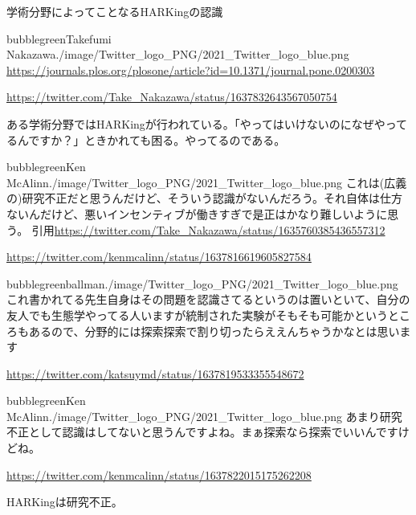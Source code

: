 \begin{SMbox}{学術分野によってことなるHARKingの認識}
        \begin{rightbubbles}{bubblegreen}{Takefumi Nakazawa}{./image/Twitter_logo_PNG/2021_Twitter_logo_blue.png}
            \url{https://journals.plos.org/plosone/article?id=10.1371/journal.pone.0200303}
            \begin{flushright} 
            \small	\url{https://twitter.com/Take_Nakazawa/status/1637832643567050754}
            \end{flushright}    
        \end{rightbubbles}
        
ある学術分野ではHARKingが行われている。「やってはいけないのになぜやってるんですか？」ときかれても困る。やってるのである。


\begin{rightbubbles}{bubblegreen}{Ken McAlinn}{./image/Twitter_logo_PNG/2021_Twitter_logo_blue.png}
    これは(広義の)研究不正だと思うんだけど、そういう認識がないんだろう。それ自体は仕方ないんだけど、悪いインセンティブが働きすぎで是正はかなり難しいように思う。
    引用\url{https://twitter.com/Take_Nakazawa/status/1635760385436557312}
    \begin{flushright} 
    \small	\url{https://twitter.com/kenmcalinn/status/1637816619605827584}
    \end{flushright}    
\end{rightbubbles}
\begin{rightbubbles}{bubblegreen}{ballman}{./image/Twitter_logo_PNG/2021_Twitter_logo_blue.png}
    これ書かれてる先生自身はその問題を認識さてるというのは置いといて、自分の友人でも生態学やってる人いますが統制された実験がそもそも可能かというところもあるので、分野的には探索探索で割り切ったらええんちゃうかなとは思います
    \begin{flushright} 
    \small	\url{https://twitter.com/katsuymd/status/1637819533355548672}
    \end{flushright}    
\end{rightbubbles}
\begin{rightbubbles}{bubblegreen}{Ken McAlinn}{./image/Twitter_logo_PNG/2021_Twitter_logo_blue.png}
    あまり研究不正として認識はしてないと思うんですよね。まぁ探索なら探索でいいんですけどね。
    \begin{flushright} 
    \small	\url{https://twitter.com/kenmcalinn/status/1637822015175262208}
    \end{flushright}    
\end{rightbubbles}

HARKingは研究不正。

\end{SMbox}

